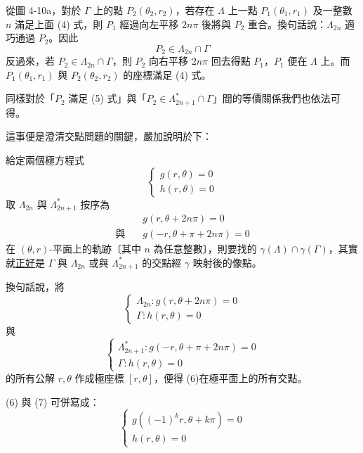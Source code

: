 從圖 4-10a，對於 $\Gamma$ 上的點 $P_2(\theta_2, r_2)$，若存在 $\Lambda$ 上一點 $P_1(\theta_1, r_1)$ 及一整數 $n$ 滿足上面 (4) 式，則 $P_1$ 經過向左平移 $2n\pi$ 後將與 $P_2$ 重合。換句話說：$\Lambda_{2n}$ 適巧通過 $P_2$。因此
\[
P_2 \in \Lambda_{2n} \cap \Gamma
\]
反過來，若 $P_2 \in \Lambda_{2n} \cap \Gamma$，則 $P_2$ 向右平移 $2n\pi$ 回去得點 $P_1$，$P_1$ 便在 $\Lambda$ 上。而 $P_1(\theta_1, r_1)$ 與 $P_2(\theta_2, r_2)$ 的座標滿足 (4) 式。

同樣對於「$P_2$ 滿足 (5) 式」與「$P_2 \in \Lambda^*_{2n+1} \cap \Gamma$」間的等價關係我們也依法可得。

這事便是澄清交點問題的關鍵，嚴加說明於下：

\medskip
\begin{theorem}\label{thm:b5-1-1}
給定兩個極方程式
\begin{equation}
\begin{cases}
g(r, \theta) = 0 \\[4pt]
h(r, \theta) = 0
\end{cases}
\tag{6}
\end{equation}
取 $\Lambda_{2n}$ 與 $\Lambda^*_{2n+1}$ 按序為
\[
\begin{aligned}
&g(r, \theta + 2n\pi) = 0 \\
\text{與}\quad &g(-r, \theta + \pi + 2n\pi) = 0
\end{aligned}
\]
在 $(\theta, r)$-平面上的軌跡〔其中 $n$ 為任意整數〕，則要找的 $\gamma(\Lambda) \cap \gamma(\Gamma)$，其實就\underline{正好}是 $\Gamma$ 與 $\Lambda_{2n}$ 或與 $\Lambda^*_{2n+1}$ 的交點經 $\gamma$ 映射後的像點。

換句話說，將
\begin{equation}
\begin{cases}
\Lambda_{2n} : g(r, \theta + 2n\pi) = 0 \\[4pt]
\Gamma : h(r, \theta) = 0
\end{cases}
\tag{6}
\end{equation}
與
\begin{equation}
\begin{cases}
\Lambda^*_{2n+1} : g(-r, \theta + \pi + 2n\pi) = 0 \\[4pt]
\Gamma : h(r, \theta) = 0
\end{cases}
\tag{7}
\end{equation}
的所有公解 $r, \theta$ 作成極座標 $[r, \theta]$，便得 (6)\footnotemark 在極平面上的所有交點。
\label{note:b5-ch1-p43-eq6}

(6) 與 (7) 可併寫成：
\begin{equation}
\begin{cases}
g((-1)^k r, \theta + k\pi) = 0 \\[4pt]
h(r, \theta) = 0
\end{cases}
\tag{8}
\end{equation}
\end{theorem}
